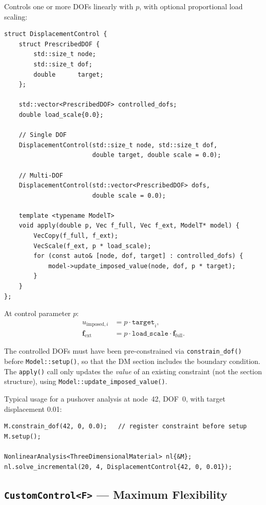 Controls one or more DOFs linearly with $p$, with optional proportional
load scaling:

\begin{lstlisting}
struct DisplacementControl {
    struct PrescribedDOF {
        std::size_t node;
        std::size_t dof;
        double      target;
    };

    std::vector<PrescribedDOF> controlled_dofs;
    double load_scale{0.0};

    // Single DOF
    DisplacementControl(std::size_t node, std::size_t dof,
                        double target, double scale = 0.0);

    // Multi-DOF
    DisplacementControl(std::vector<PrescribedDOF> dofs,
                        double scale = 0.0);

    template <typename ModelT>
    void apply(double p, Vec f_full, Vec f_ext, ModelT* model) {
        VecCopy(f_full, f_ext);
        VecScale(f_ext, p * load_scale);
        for (const auto& [node, dof, target] : controlled_dofs) {
            model->update_imposed_value(node, dof, p * target);
        }
    }
};
\end{lstlisting}

At control parameter $p$:
\begin{align}
  u_{\text{imposed}, i} &= p \cdot \mathtt{target}_i, \label{eq:ic-disp-dof} \\
  \mathbf{f}_\text{ext} &= p \cdot \mathtt{load\_scale} \cdot \mathbf{f}_\text{full}.
  \label{eq:ic-disp-fext}
\end{align}

The controlled DOFs must have been pre-constrained via
\texttt{constrain\_dof()} before \texttt{Model::setup()}, so that the DM
section includes the boundary condition.  The \texttt{apply()} call only
updates the \emph{value} of an existing constraint (not the section
structure), using \texttt{Model::update\_imposed\_value()}.

Typical usage for a pushover analysis at node~42, DOF~0, with
target displacement 0.01:

\begin{lstlisting}
M.constrain_dof(42, 0, 0.0);   // register constraint before setup
M.setup();

NonlinearAnalysis<ThreeDimensionalMaterial> nl{&M};
nl.solve_incremental(20, 4, DisplacementControl{42, 0, 0.01});
\end{lstlisting}

\subsection{\texttt{CustomControl<F>} --- Maximum Flexibility}
\label{ssec:ic-custom}


